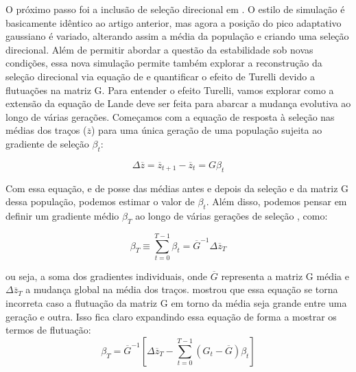 \documentclass[a4paper, 12pt, titlepage, onecolumn]{article}
\numberwithin{equation}{section}
\numberwithin{table}{section}
\begin{document}
O próximo passo foi a inclusão de seleção direcional em
\cite{Jones2004}. O estilo de simulação é basicamente idêntico ao artigo
anterior, mas agora a posição do pico adaptativo gaussiano é variado,
alterando assim a média da população e criando uma seleção direcional.
Além de permitir abordar a questão da estabilidade sob novas condições,
essa nova simulação permite também explorar a reconstrução da seleção
direcional via equação de \cite{Lande1979} e quantificar o efeito de
Turelli devido a flutuações na matriz G. Para entender o efeito Turelli,
vamos explorar como a extensão da equação de Lande deve ser feita para
abarcar a mudança evolutiva ao longo de várias gerações. Começamos com a
equação de resposta à seleção nas médias dos traços ($\overline {z}$)
para uma única geração de uma população sujeita ao gradiente de seleção
$\beta_t$:

\begin{equation}
\Delta \overline {z} = \overline {z}_{t+1}-\overline {z}_{t}=G\beta_t
\end{equation}

Com essa equação, e de posse das médias antes e depois da seleção e da
matriz G dessa população, podemos estimar o valor de $\beta_t$. Além
disso, podemos pensar em definir um gradiente médio $\beta_T$  ao longo
de várias gerações de seleção \citep{Lande1979}, como:

\begin{equation}
\beta_{T}\equiv \sum _{t=0}^{T-1} \beta_t =  \overline {G}^{-1}\Delta \overline {z}_T 
\end{equation}

ou seja, a soma dos gradientes individuais, onde $\overline {G}$
representa a matriz G média e $\Delta \overline {z}_T$ a mudança global
na média dos traços. \cite{Turelli1988} mostrou que essa equação se
torna incorreta caso a flutuação da matriz G em torno da média seja
grande entre uma geração e outra. Isso fica claro expandindo essa equação
de forma a mostrar os termos de flutuação:
\begin{equation}
   \beta_T = \overline {G}^{-1} \left[ \Delta \overline {z}_T - \sum_{t=0}^{T-1} (G_t - \overline {G}) \beta_t\right]
\end{equation}
\end{document}
